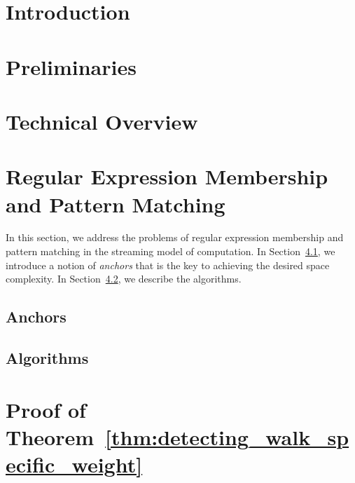 \section{Introduction}
\label{sec:introduction}


\section{Preliminaries}
\label{sec:prelim}


\section{Technical Overview}
\label{sec:overview}


\section{Regular Expression Membership and Pattern Matching}\label{sec:regexp}
In this section, we address the problems of regular expression membership and pattern matching in the streaming model of computation. In Section~\ref{sec:anchors}, we introduce a notion of \emph{anchors} that is the key to achieving the desired space complexity. In Section~\ref{sec:algorithms}, we describe the algorithms.

\subsection{Anchors}
\label{sec:anchors}


\subsection{Algorithms}
\label{sec:algorithms}


\section{Proof of Theorem~\ref{thm:detecting_walk_specific_weight}}
\label{sec:paths-in-graph}


\BiblatexSplitbibDefernumbersWarningOff

\backmatter
{}
\printbibliography[heading=subbibintoc]